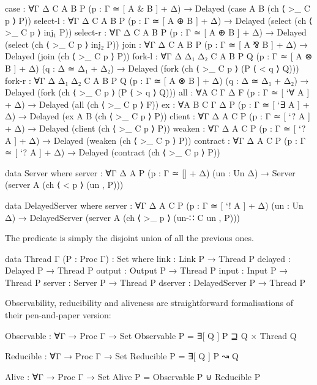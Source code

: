 \begin{AgdaAlign}
\begin{code}[hide]
  case     : ∀{Γ Δ C A B P} (p : Γ ≃ [ A & B ] + Δ) → Delayed (case {A} {B} (ch ⟨ >_ {C} p ⟩ P))
  select-l : ∀{Γ Δ C A B P} (p : Γ ≃ [ A ⊕ B ] + Δ) → Delayed (select (ch ⟨ >_ {C} p ⟩ inj₁ P))
  select-r : ∀{Γ Δ C A B P} (p : Γ ≃ [ A ⊕ B ] + Δ) → Delayed (select (ch ⟨ >_ {C} p ⟩ inj₂ P))
  join     : ∀{Γ Δ C A B P} (p : Γ ≃ [ A ⅋ B ] + Δ) → Delayed (join (ch ⟨ >_ {C} p ⟩ P))
  fork-l   : ∀{Γ Δ Δ₁ Δ₂ C A B P Q} (p : Γ ≃ [ A ⊗ B ] + Δ) (q : Δ ≃ Δ₁ + Δ₂) →
             Delayed (fork (ch ⟨ >_ {C} p ⟩ (P ⟨ < q ⟩ Q)))
  fork-r   : ∀{Γ Δ Δ₁ Δ₂ C A B P Q} (p : Γ ≃ [ A ⊗ B ] + Δ) (q : Δ ≃ Δ₁ + Δ₂) →
             Delayed (fork (ch ⟨ >_ {C} p ⟩ (P ⟨ > q ⟩ Q)))
  all      : ∀{A C Γ Δ F} (p : Γ ≃ [ `∀ A ] + Δ) → Delayed (all (ch ⟨ >_ {C} p ⟩ F))
  ex       : ∀{A B C Γ Δ P} (p : Γ ≃ [ `∃ A ] + Δ) → Delayed (ex {A} {B} (ch ⟨ >_ {C} p ⟩ P))
  client   : ∀{Γ Δ A C P} (p : Γ ≃ [ `? A ] + Δ) → Delayed (client (ch ⟨ >_ {C} p ⟩ P))
  weaken   : ∀{Γ Δ A C P} (p : Γ ≃ [ `? A ] + Δ) → Delayed (weaken (ch ⟨ >_ {C} p ⟩ P))
  contract : ∀{Γ Δ A C P} (p : Γ ≃ [ `? A ] + Δ) → Delayed (contract (ch ⟨ >_ {C} p ⟩ P))

data Server where
  server : ∀{Γ Δ A P} (p : Γ ≃ [] + Δ) (un : Un Δ) → Server (server {A} (ch ⟨ < p ⟩ (un , P)))

data DelayedServer where
  server : ∀{Γ Δ A C P} (p : Γ ≃ [ `! A ] + Δ) (un : Un Δ) →
           DelayedServer (server {A} (ch ⟨ >_ p ⟩ (un-∷ {C} un , P)))
\end{code}
\end{AgdaAlign}

The predicate  is simply the disjoint union of all the
previous ones.

\begin{code}
data Thread {Γ} (P : Proc Γ) : Set where
  link     : Link P → Thread P
  delayed  : Delayed P → Thread P
  output   : Output P → Thread P
  input    : Input P → Thread P
  server   : Server P → Thread P
  dserver  : DelayedServer P → Thread P
\end{code}

Observability, reducibility and aliveness are straightforward formalisations of
their pen-and-paper version:

\begin{code}
Observable : ∀{Γ} → Proc Γ → Set
Observable P = ∃[ Q ] P ⊒ Q × Thread Q

Reducible : ∀{Γ} → Proc Γ → Set
Reducible P = ∃[ Q ] P ↝ Q

Alive : ∀{Γ} → Proc Γ → Set
Alive P = Observable P ⊎ Reducible P
\end{code}

